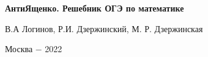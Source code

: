 \begin{titlepage}
		\centering
		
		\vspace{4cm}
		{\scshape\Large \par}
		\vspace{1.5cm}
		{\huge\bfseries АнтиЯщенко. Решебник ОГЭ по математике \par}
		\vspace{2cm}
		{\Large В.А Логинов, Р.И. Дзержинский, М. Р. Дзержинская\par}
		\vfill
			\par
		
		\vfill
		
		{\large Москва $-$ 2022\par}
\end{titlepage}
\pagestyle{empty}
\clearpage

\endinput